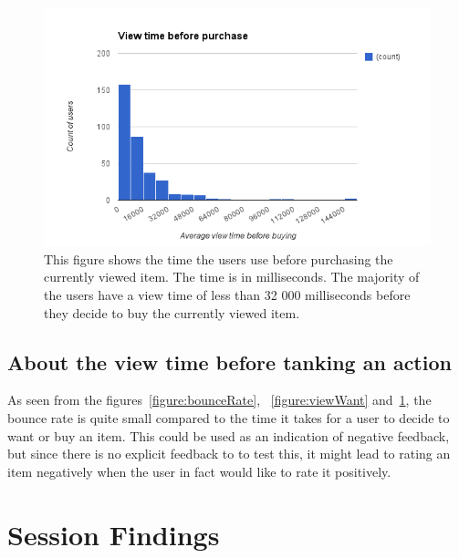     \begin{figure}[H]
        \includegraphics[width=5in]{image/viewBeforePurchase.png}
        \centering
        \caption[View time before purchasing an item]{This figure shows the time the users use before purchasing the currently viewed item.
        The time is in milliseconds.
        The majority of the users have a view time of less than 32 000 milliseconds before they decide to buy the currently viewed item.}
        \label{figure:viewBuy}
    \end{figure}

\subsection{About the view time before tanking an action}
    As seen from the figures~\ref{figure:bounceRate}, ~\ref{figure:viewWant} and~\ref{figure:viewBuy}, the bounce rate is quite small compared to the time it takes for a user to decide to want or buy an item.
    This could be used as an indication of negative feedback, but since there is no explicit feedback to to test this, it might lead to rating an item negatively when the user in fact would like to rate it positively.

\section{Session Findings}



